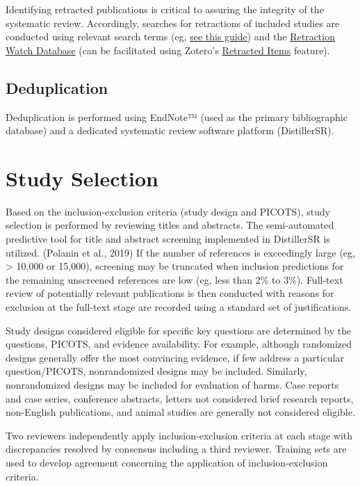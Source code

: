\documentclass[
  letterpaper,
  DIV=11,
  numbers=noendperiod]{scrreprt}
\begin{document}
Identifying retracted publications is critical to assuring the integrity
of the systematic review. Accordingly, searches for retractions of
included studies are conducted using relevant search terms (eg,
\href{https://ambulance.libguides.com/retracted}{see this guide}) and
the
\href{http://retractiondatabase.org/RetractionSearch.aspx?}{Retraction
Watch Database} (can be facilitated using Zotero's
\href{https://www.zotero.org/blog/retracted-item-notifications/}{Retracted
Items} feature).

\hypertarget{deduplication}{%
\subsection{Deduplication}\label{deduplication}}

Deduplication is performed using EndNote™ (used as the primary
bibliographic database) and a dedicated systematic review software
platform (DistillerSR).

\hypertarget{study-selection}{%
\section{Study Selection}\label{study-selection}}

Based on the inclusion-exclusion criteria (study design and PICOTS),
study selection is performed by reviewing titles and abstracts. The
semi-automated predictive tool for title and abstract screening
implemented in DistillerSR is utilized. (Polanin et al., 2019) If the
number of references is exceedingly large (eg, \textgreater{} 10,000 or
15,000), screening may be truncated when inclusion predictions for the
remaining unscreened references are low (eg, less than 2\% to 3\%).
Full-text review of potentially relevant publications is then conducted
with reasons for exclusion at the full-text stage are recorded using a
standard set of justifications.

Study designs considered eligible for specific key questions are
determined by the questions, PICOTS, and evidence availability. For
example, although randomized designs generally offer the most convincing
evidence, if few address a particular question/PICOTS, nonrandomized
designs may be included. Similarly, nonrandomized designs may be
included for evaluation of harms. Case reports and case series,
conference abstracts, letters not considered brief research reports,
non-English publications, and animal studies are generally not
considered eligible.

Two reviewers independently apply inclusion-exclusion criteria at each
stage with discrepancies resolved by consensus including a third
reviewer. Training sets are used to develop agreement concerning the
application of inclusion-exclusion criteria.
\end{document}

